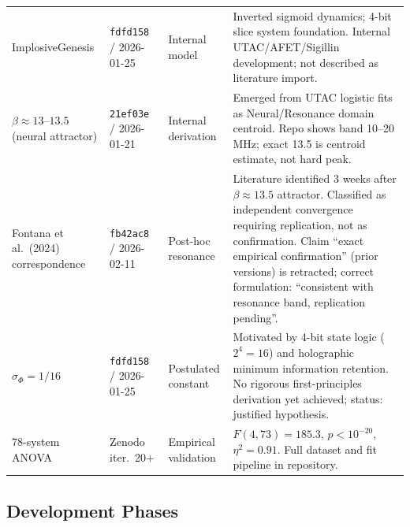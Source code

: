 \documentclass[12pt,a4paper]{article}
\theoremstyle{definition}
\newcommand{\sigphi}{\sigma_{\Phi}}
\begin{document}
\begin{longtable}{p{2.8cm}p{2.2cm}p{2.2cm}p{5.2cm}}
ImplosiveGenesis & \texttt{fdfd158} / 2026-01-25 & Internal model &
  Inverted sigmoid dynamics; 4-bit slice system foundation.
  Internal UTAC/AFET/Sigillin development; not described as literature import. \\[4pt]

$\beta \approx 13$--$13.5$ (neural attractor) & \texttt{21ef03e} / 2026-01-21 &
  Internal derivation &
  Emerged from UTAC logistic fits as Neural/Resonance domain centroid.
  Repo shows band 10--20\,MHz; exact 13.5 is centroid estimate, not hard peak. \\[4pt]

Fontana et al.\ (2024) correspondence & \texttt{fb42ac8} / 2026-02-11 &
  Post-hoc resonance &
  Literature identified 3 weeks after $\beta \approx 13.5$ attractor.
  Classified as independent convergence requiring replication,
  not as confirmation. Claim ``exact empirical confirmation'' (prior versions)
  is retracted; correct formulation: ``consistent with resonance band,
  replication pending''. \\[4pt]

$\sigphi = 1/16$ & \texttt{fdfd158} / 2026-01-25 & Postulated constant &
  Motivated by 4-bit state logic ($2^4 = 16$) and holographic minimum
  information retention. No rigorous first-principles derivation yet achieved;
  status: justified hypothesis. \\[4pt]

78-system ANOVA & Zenodo iter.\ 20+ & Empirical validation &
  $F(4,73)=185.3$, $p < 10^{-20}$, $\eta^2 = 0.91$.
  Full dataset and fit pipeline in repository. \\[4pt]

\bottomrule
\end{longtable}

\subsection*{Development Phases}
\end{document}
